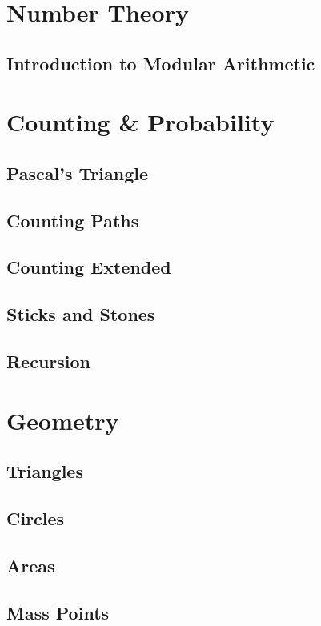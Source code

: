 \documentclass{book}
\begin{document}
\chapter{Number Theory}
\section{Introduction to Modular Arithmetic}


\chapter{Counting \& Probability}
\section{Pascal's Triangle}

\newpage
\section{Counting Paths}

\newpage
\section{Counting Extended}

\newpage
\section{Sticks and Stones}

\newpage
\section{Recursion}


\chapter{Geometry}
\section{Triangles}

\newpage
\section{Circles}

\newpage 
\section{Areas}

\newpage 
\section{Mass Points}

\newpage 
\end{document}

